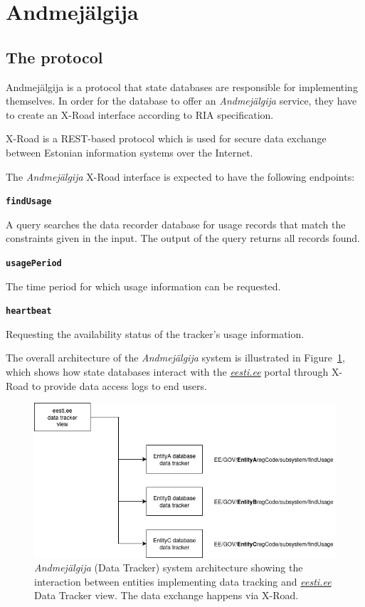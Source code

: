 \section{Andmejälgija} \label{Andmejälgija}

\subsection{The protocol} \label{protocol_desc}

Andmejälgija is a protocol that state databases are responsible for implementing themselves. In order for the database to offer an \textit{Andmejälgija} service, they have to create an X-Road interface according to RIA specification\cite{aj-github-spec}. 

X-Road is a REST-based protocol which is used for secure data exchange between Estonian information systems over the Internet.

The \textit{Andmejälgija} X-Road interface is expected to have the following endpoints:

\textbf{\texttt{findUsage}}

A query searches the data recorder database for usage records that match the constraints given in the input. The output of the query returns all records found\cite{aj-github-spec}.

\textbf{\texttt{usagePeriod}}

The time period for which usage information can be requested\cite{aj-github-spec}.

\textbf{\texttt{heartbeat}}

Requesting the availability status of the tracker's usage information\cite{aj-github-spec}.

The overall architecture of the \textit{Andmejälgija} system is illustrated in Figure~\ref{fig:aj-model}, which shows how state databases interact with the \textit{\href{https://www.eesti.ee}{eesti.ee}} portal through X-Road to provide data access logs to end users.

\begin{figure}[H]
\centering
\includegraphics[width=450px]{english/figures/aj_model.PNG}
\caption{\textit{Andmejälgija} (Data Tracker) system architecture showing the interaction between entities implementing data tracking and \textit{\href{https://www.eesti.ee}{eesti.ee}} Data Tracker view. The data exchange happens via X-Road\cite{aj-github}.}
\label{fig:aj-model}
\end{figure}

